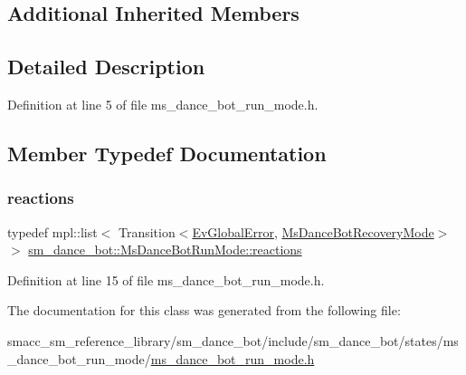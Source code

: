 \subsection*{Additional Inherited Members}


\subsection{Detailed Description}


Definition at line 5 of file ms\+\_\+dance\+\_\+bot\+\_\+run\+\_\+mode.\+h.



\subsection{Member Typedef Documentation}
\mbox{\label{classsm__dance__bot_1_1MsDanceBotRunMode_af3a90639a2610f394d8487a2b1725c56}} 
\subsubsection{\texorpdfstring{reactions}{reactions}}
{\footnotesize\ttfamily typedef mpl\+::list$<$ Transition$<$\hyperlink{structsm__dance__bot_1_1EvGlobalError}{Ev\+Global\+Error}, \hyperlink{classsm__dance__bot_1_1MsDanceBotRecoveryMode}{Ms\+Dance\+Bot\+Recovery\+Mode}$>$ $>$ \hyperlink{classsm__dance__bot_1_1MsDanceBotRunMode_af3a90639a2610f394d8487a2b1725c56}{sm\+\_\+dance\+\_\+bot\+::\+Ms\+Dance\+Bot\+Run\+Mode\+::reactions}}



Definition at line 15 of file ms\+\_\+dance\+\_\+bot\+\_\+run\+\_\+mode.\+h.



The documentation for this class was generated from the following file\+:\begin{DoxyCompactItemize}
\item 
smacc\+\_\+sm\+\_\+reference\+\_\+library/sm\+\_\+dance\+\_\+bot/include/sm\+\_\+dance\+\_\+bot/states/ms\+\_\+dance\+\_\+bot\+\_\+run\+\_\+mode/\hyperlink{include_2sm__dance__bot_2states_2ms__dance__bot__run__mode_2ms__dance__bot__run__mode_8h}{ms\+\_\+dance\+\_\+bot\+\_\+run\+\_\+mode.\+h}\end{DoxyCompactItemize}
